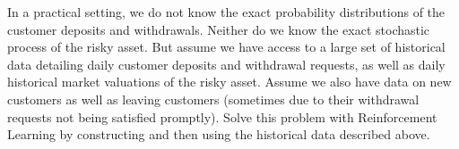 \documentclass[12pt]{exam}
\begin{document}
\begin{questions}
In a practical setting, we do not know the exact probability distributions of the customer deposits and withdrawals. Neither do we know the exact stochastic process of the risky asset. But assume we have access to a large set of historical data detailing daily customer deposits and withdrawal requests, as well as daily historical market valuations of the risky asset. Assume we also have data on new customers as well as leaving customers (sometimes due to their withdrawal requests not being satisfied promptly). Solve this problem with Reinforcement Learning by constructing and then using the historical data described above.


\end{questions}
\end{document}

